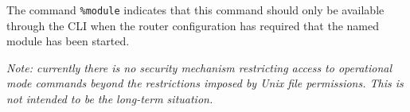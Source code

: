 \documentclass[11pt]{article}
\begin{document}
The command {\tt \%module} indicates that this command should only be
available through the CLI when the router configuration has required
that the named module has been started.

\textit{Note: currently there is no security mechanism restricting
access to operational mode commands beyond the restrictions imposed by
Unix file permissions.  This is not intended to be the long-term
situation.}
\end{document}
